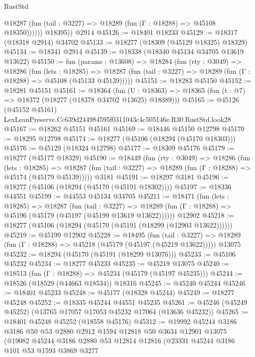 \begin{lexlean}{RustStd}
\begin{coremodule}
              @18287 (fun (tail : @3227) => @18289 (fun (Γ : @18288) => @45108 @18350))))))
        @18395))
    @2914
@45126 := @18401 @18233
@45129 := @18317 (@18318 @2914) @34702
@45133 := @18277 (@18309 (@45129 @18325) @18329)
@45134 := @18341 @2914
@45139 := @18338 (@18340 @45134 @34705 @13619 @13622)
@45150 := fun (params : @13608) =>
  @18284
    (fun (rty : @3049) =>
    @18286
      (fun (lets : @18285) =>
      @18287 (fun (tail : @3227) => @18289 (fun (Γ : @18288) => @45108 (@45133 @45139)))))
@45151 := @18283 @45150
@45152 := @18281 @45151
@45161 := @18364
    (fun (U : @18363) => @18365 (fun (t : @7) => @18372 (@18277 (@18378 @34702 @13625) @18389)))
@45165 := @45126
    (@45152 @45161)
    LexLeanPreserve.Cc639d244984595f0311043c4c505146e.R30.RustStd.look28
@45167 := @18262 @45151 @45161
@45169 := @18446 @45150 @12798
@45170 := @18295 @12798
@45174 := @18277 (@45106 (@18294 (@45170 @18303)))
@45176 := @45129 (@18324 @12798)
@45177 := @18309 @45176
@45179 := @18277 (@45177 @18329)
@45190 := @18449
    (fun (rty : @3049) =>
    @18286
      (fun (lets : @18285) =>
      @18287 (fun (tail : @3227) => @18289 (fun (Γ : @18288) => @45174 (@45179 @45139)))))
    @3181
@45191 := @18297 @3181
@45196 := @18277 (@45106 (@18294 (@45170 (@45191 @18302))))
@45197 := @18336 @44551
@45199 := @44553 @45134 @34705
@45211 := @18471
    (fun (lets : @18285) =>
    @18287
      (fun (tail : @3227) =>
      @18289 (fun (Γ : @18288) => @45196 (@45179 (@45197 (@45199 @13619 @13622))))))
    @12902
@45218 := @18277 (@45106 (@18294 (@45170 (@45191 (@18299 (@12903 @13622))))))
@45219 := @45199 @12902
@45228 := @18495
    (fun (tail : @3227) => @18289 (fun (Γ : @18288) => @45218 (@45179 (@45197 (@45219 @13622)))))
    @13075
@45232 := @18294 (@45170 (@45191 (@18299 @13076)))
@45233 := @45106 @45232
@45234 := @18277 @45233
@45235 := @45219 @13075
@45240 := @18513 (fun (Γ : @18288) => @45234 (@45179 (@45197 @45235)))
@45244 := @18526 (@18529 (@44663 @18534)) @18316
@45245 := @45240 @45244
@45246 := @18401 @45233
@45248 := @45177 (@18328 @45244)
@45249 := @18277 @45248
@45252 := @18335 @45244 @44551 @45235
@45261 := @45246 (@45249 @45252) (@13765 @17057 @17053 @45232 @17064 (@13636 @45232))
@45265 := @18401 @45248 @45252 (@18558 @45176)
@45312 := @19992
    @45244
    @3186
    @3186
    @50
    @53
    @2880
    @2912
    @1594
    @12818
    @50
    @3634
    @12901
    @13075
    (@19082
      @45244
      @3186
      @2880
      @53
      @12814
      @12816
      (@23331
        @45244
        @3186
        @101
        @53
        @1593
        @3869
        @3277

\end{coremodule}
\end{lexlean}
